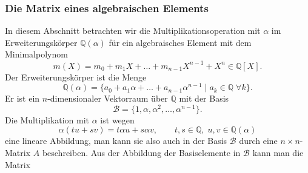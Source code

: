 \subsubsection{Die Matrix eines algebraischen Elements}
In diesem Abschnitt betrachten wir die Multiplikationsoperation
mit $\alpha$ im Erweiterungskörper $\mathbb{Q}(\alpha)$ für ein
algebraisches Element mit dem Minimalpolynom
\[
m(X)
=
m_0+m_1X+\dots + m_{n-1}X^{n-1}+X^n
\in
\mathbb{Q}[X].
\]
Der Erweiterungskörper ist die Menge
\[
\mathbb{Q}(\alpha)
=
\{
a_0+a_1\alpha+\ldots+a_{n-1}\alpha^{n-1}
\mid
a_k\in\mathbb{Q}\;
\forall k
\}.
\]
Er ist ein $n$-dimensionaler Vektorraum über $\mathbb{Q}$ mit der
Basis
\[
\mathscr{B}
=
\{
1,\alpha,\alpha^2,\ldots,\alpha^{n-1}
\}.
\]
Die Multiplikation mit $\alpha$ ist wegen
\[
\alpha (t u + s v)
=
t
\alpha
u
+
s
\alpha
v
,\qquad t,s\in\mathbb{Q},\;u,v\in\mathbb{Q}(\alpha)
\]
eine lineare Abbildung, man kann sie also auch in der Basis
$\mathscr{B}$ durch eine $n\times n$-Matrix $A$ beschreiben.
Aus der Abbildung der Basiselemente in $\mathscr{B}$ kann
man die Matrix
